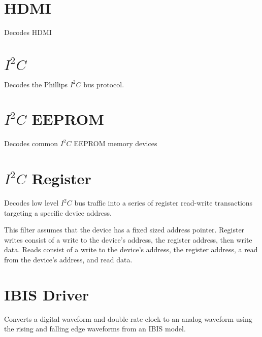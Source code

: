 \pagebreak
\section{HDMI}
\label{filter:hdmi}

Decodes HDMI

\pagebreak
\section{$I^2C$}

Decodes the Phillips $I^2C$ bus protocol.

\pagebreak
\section{$I^2C$ EEPROM}

Decodes common $I^2C$ EEPROM memory devices

\pagebreak
\section{$I^2C$ Register}

Decodes low level $I^2C$ bus traffic into a series of register read-write transactions targeting a specific device
address.

This filter assumes that the device has a fixed sized address pointer. Register writes consist of a write to the
device's address, the register address, then write data. Reads consist of a write to the device's address, the register
address, a read from the device's address, and read data.

\pagebreak
\section{IBIS Driver}
\label{filter:ibisdriver}

Converts a digital waveform and double-rate clock to an analog waveform using the rising and falling edge waveforms
from an IBIS model.

